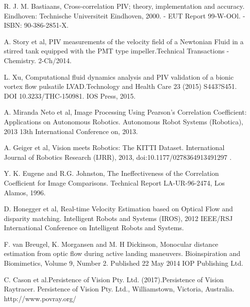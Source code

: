 \documentclass[letterpaper, 10 pt,conference]{ieeeconf}  %
\begin{document}
\begin{thebibliography}{99}
	 R. J. M. Bastiaans, Cross-correlation PIV; theory, implementation and accuracy. 
        Eindhoven: Technische Universiteit Eindhoven, 2000. - EUT Report 99-W-OOl. - ISBN: 90-386-2851-X.

	 A. Story et al, PIV measurements of the velocity field of a Newtonian Fluid in a stirred tank equipped 
	with the PMT type impeller.Technical Transactions - Chemistry. 2-Ch/2014.        

	 L. Xu, Computational fluid dynamics analysis and PIV validation of a bionic vortex flow 
	pulsatile LVAD.Technology and Health Care 23 (2015) S443?S451. DOI 10.3233/THC-150981. IOS Press, 2015.
	
         A. Miranda Neto et al, Image Processing Using Pearson's Correlation Coefficient: 
        Applications on Autonomous Robotics. 
        Autonomous Robot Systems (Robotica), 2013 13th International Conference on, 2013.
        
         A. Geiger et al,
        Vision meets Robotics: The KITTI Dataset. International Journal of Robotics Research (IJRR), 2013, 
        doi:10.1177/0278364913491297 .
        
         Y. K. Eugene and R.G. Johnston, The Ineffectiveness of the Correlation Coefficient for Image Comparisons.
        Technical Report LA-UR-96-2474, Los Alamos, 1996.
        
         D. Honegger et al, Real-time Velocity Estimation based on Optical Flow and disparity matching.
         Intelligent Robots and Systems (IROS), 2012 IEEE/RSJ International Conference on Intelligent Robots and Systems.
        
         F. van Breugel, K. Morgansen and M. H Dickinson, Monocular distance estimation from optic flow during
        active landing maneuvers. Bioinspiration and Biomimetics, Volume 9, Number 2. Published 22 May 2014 IOP Publishing Ltd.
        
	  C. Cason et al.Persistence of Vision Pty. Ltd. (2017).Persistence of Vision Raytracer.
	Persistence of Vision Pty. Ltd., Williamstown, Victoria, Australia. http://www.povray.org/
	
\end{thebibliography}
\end{document}
